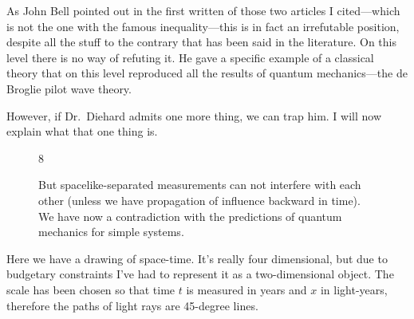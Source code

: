 \documentclass[twocolumn,prb]{revtex4}
\begin{document}
As John Bell pointed out in the first written of those two articles I cited\cite{bell64physics195}---which is not the one with the famous inequality---this is in fact an irrefutable position, despite all the stuff to the contrary that has been said in the literature. On this level there is no way of refuting it. He gave a specific example of a classical theory that on this level reproduced all the results of quantum mechanics---the de Broglie pilot wave theory\cite{bohm52prb166}.

However, if Dr.\ Diehard admits one more thing, we can trap him. I will now explain what that one thing is.

\begin{figure}[htb] 
\begin{mdframed}
  \vspace{5pt}\hfill 8\\[-18pt]
  \begin{center}
  \end{center}
  \begin{raggedright}
    But spacelike-separated measurements can not interfere with each other (unless we have propagation of influence backward in time).\\[\baselineskip]

We have now a contradiction with the predictions of quantum mechanics for simple systems. 
  \end{raggedright}
  \vspace{6pt}
\end{mdframed}
\end{figure}

Here we have a drawing of space-time. It's really four dimensional, but due to budgetary constraints I've had to represent it as a two-dimensional object. The scale has been chosen so that time $t$ is measured in years and $x$ in light-years, therefore the paths of light rays are 45-degree lines.
\end{document}

